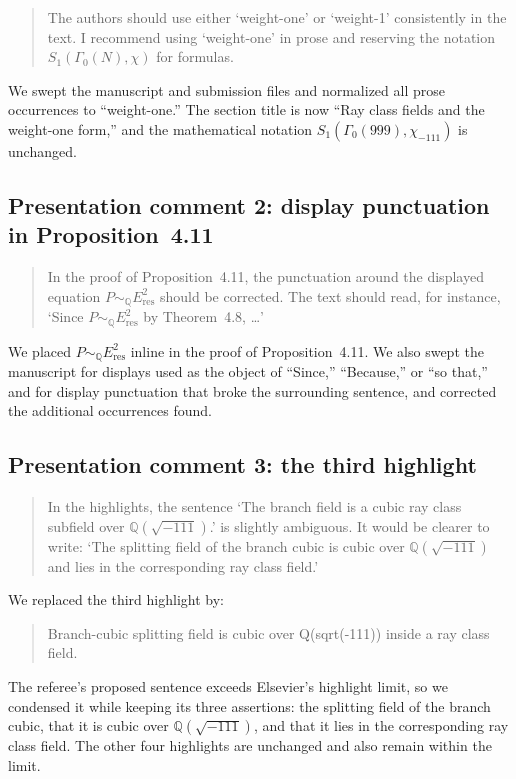 \documentclass[11pt,letterpaper]{article}
\newcommand{\QQ}{\mathbb{Q}}
\begin{document}
\begin{quote}
The authors should use either `weight-one' or `weight-1' consistently in the text. I recommend using `weight-one' in prose and reserving the notation \(S_1(\Gamma_0(N),\chi)\) for formulas.
\end{quote}

We swept the manuscript and submission files and normalized all prose occurrences to ``weight-one.'' The section title is now ``Ray class fields and the weight-one form,'' and the mathematical notation \(S_1(\Gamma_0(999),\chi_{-111})\) is unchanged.

\subsection*{Presentation comment 2: display punctuation in Proposition~4.11}

\begin{quote}
In the proof of Proposition~4.11, the punctuation around the displayed equation \(P\sim_{\QQ}E_{\mathrm{res}}^2\) should be corrected. The text should read, for instance, `Since \(P\sim_{\QQ}E_{\mathrm{res}}^2\) by Theorem~4.8, \dots'
\end{quote}

We placed \(P\sim_{\QQ}E_{\mathrm{res}}^2\) inline in the proof of Proposition~4.11. We also swept the manuscript for displays used as the object of ``Since,'' ``Because,'' or ``so that,'' and for display punctuation that broke the surrounding sentence, and corrected the additional occurrences found.

\subsection*{Presentation comment 3: the third highlight}

\begin{quote}
In the highlights, the sentence `The branch field is a cubic ray class subfield over \(\QQ(\sqrt{-111})\).' is slightly ambiguous. It would be clearer to write: `The splitting field of the branch cubic is cubic over \(\QQ(\sqrt{-111})\) and lies in the corresponding ray class field.'
\end{quote}

We replaced the third highlight by:
\begin{quote}
Branch-cubic splitting field is cubic over Q(sqrt(-111)) inside a ray class field.
\end{quote}
The referee's proposed sentence exceeds Elsevier's highlight limit, so we condensed it while keeping its three assertions: the splitting field of the branch cubic, that it is cubic over \(\QQ(\sqrt{-111})\), and that it lies in the corresponding ray class field. The other four highlights are unchanged and also remain within the limit.
\end{document}
